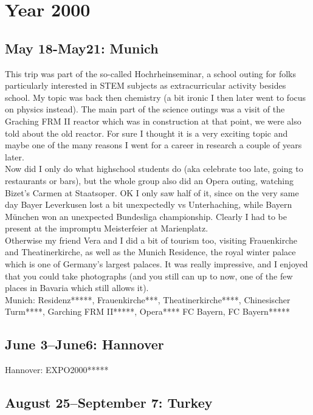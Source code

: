 \chapter{Year 2000}
\label{2000}

\section{May 18-May21: Munich}
\label{2000:Munich}

This trip was part of the so-called Hochrheinseminar, a school outing for folks particularly interested in STEM subjects as extracurricular activity besides school. My topic was back then chemistry (a bit ironic I then later went to focus on physics instead). The main part of the science outings was a visit of the Graching FRM II reactor which was in construction at that point, we were also told about the old reactor. For sure I thought it is a very exciting topic and maybe one of the many reasons I went for a career in research a couple of years later.\\
Now did I only do what highschool students do (aka celebrate too late, going to restaurants or bars), but the whole group also did an Opera outing, watching Bizet's Carmen at Staatsoper. OK I only saw half of it, since on the very same day Bayer Leverkusen lost a bit unexpectedly vs Unterhaching, while Bayern M\"unchen won an unexpected Bundesliga championship. Clearly I had to be present at the impromptu Meisterfeier at Marienplatz.\\
Otherwise my friend Vera and I did a bit of tourism too, visiting Frauenkirche and Theatinerkirche, as well as the Munich Residence, the royal winter palace which is one of Germany's largest palaces. It was really impressive, and I enjoyed that you could take photographs (and you still can up to now, one of the few places in Bavaria which still allows it).\\ 

Munich: Residenz*****, Frauenkirche***, Theatinerkirche****, Chinesischer Turm****, Garching FRM II*****, Opera****
FC Bayern, FC Bayern*****

\section{June 3--June6: Hannover}
\label{2000:Hannover}

Hannover: EXPO2000*****

\section{August 25--September 7: Turkey}
\label{2000:Turkey}

